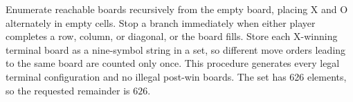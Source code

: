 Enumerate reachable boards recursively from the empty board, placing X and O alternately in empty cells. Stop a branch immediately when either player completes a row, column, or diagonal, or the board fills. Store each X-winning terminal board as a nine-symbol string in a set, so different move orders leading to the same board are counted only once. This procedure generates every legal terminal configuration and no illegal post-win boards. The set has 626 elements, so the requested remainder is $\boxed{626}$.
